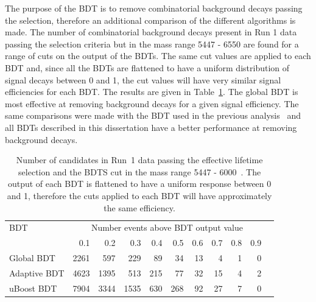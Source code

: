 The purpose of the BDT is to remove combinatorial background decays passing the \bsmumu selection, therefore an additional comparison of the different algorithms is made. The number of combinatorial background decays present in Run 1 data passing the \el selection criteria but in the mass range 5447 - 6550 \mevcc are found for a range of cuts on the output of the BDTs. %
The same cut values are applied to each BDT and, since all the BDTs are flattened to have a uniform distribution of signal decays between 0 and 1, the cut values will have very similar signal efficiencies for each BDT. %
The results are given in Table~\ref{tab:bkgdsC}. The global BDT is most effective at removing background decays for a given signal efficiency.
The same comparisons were made with the BDT used in the previous analysis~\cite{Aaij:2013aka, CMS:2014xfa} and all BDTs described in this dissertation have a better performance at removing background decays. 




\begin{table}[tbp]
\begin{center}
\begin{tabular}{lrrrrrrrrrr}
\toprule \toprule
BDT & \multicolumn{9}{c}{Number events above BDT output value}  \\
\cmidrule{2-10}
   & 0.1 & 0.2 & 0.3 & 0.4 & 0.5 & 0.6 & 0.7 & 0.8 & 0.9 \\ \midrule
Global BDT  & 2261 & 597 & 229 & 89 & 34 & 13 & 4 & 1 & 0 \\ 
Adaptive BDT  & 4623 & 1395 & 513 & 215 & 77 & 32 & 15 & 4 & 2 \\
uBoost BDT & 7904 & 3344 & 1535 &630 & 268 & 92 & 27 & 7 & 0 \\
\bottomrule \bottomrule
\end{tabular}
\vspace{0.7cm}
\vspace{0.7cm}
\caption{Number of candidates in Run~1 data passing the effective lifetime selection and the BDTS cut in the mass range 5447 - 6000~\mevcc. The output of each BDT is flattened to have a uniform response between 0 and 1, therefore the cuts applied to each BDT will have approximately the same efficiency.}
\label{tab:bkgdsC}
\end{center}
\vspace{-1.0cm}
\end{table}


